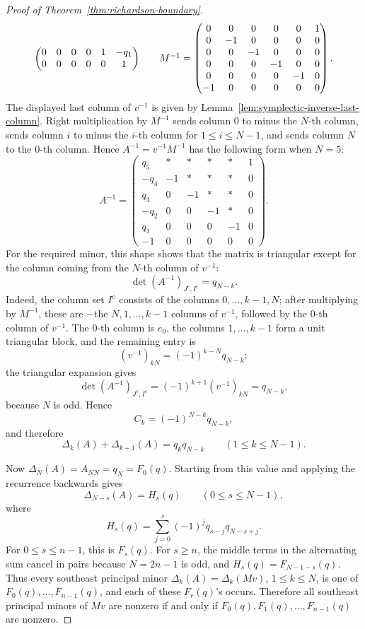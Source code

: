 \documentclass{article}
\begin{document}
\begin{proof}[Proof of Theorem~\ref{thm:richardson-boundary}]
\[\begin{array}{c@{\qquad}c}
\begin{pmatrix}
0&0&0&0&1&-q_1\\
0&0&0&0&0&1
\end{pmatrix}
&
M^{-1}=
\begin{pmatrix}
0&0&0&0&0&1\\
0&-1&0&0&0&0\\
0&0&-1&0&0&0\\
0&0&0&-1&0&0\\
0&0&0&0&-1&0\\
-1&0&0&0&0&0
\end{pmatrix}.
\end{array}
\]
The displayed last column of \(v^{-1}\) is given by Lemma~\ref{lem:symplectic-inverse-last-column}.
Right multiplication by \(M^{-1}\) sends column \(0\) to minus the \(N\)-th column, sends column \(i\) to minus the \(i\)-th column for \(1\le i\le N-1\), and sends column \(N\) to the \(0\)-th column. Hence \(A^{-1}=v^{-1}M^{-1}\) has the following form when \(N=5\):
\[
A^{-1}=
\begin{pmatrix}
q_5&*&*&*&*&1\\
-q_4&-1&*&*&*&0\\
q_3&0&-1&*&*&0\\
-q_2&0&0&-1&*&0\\
q_1&0&0&0&-1&0\\
-1&0&0&0&0&0
\end{pmatrix}.
\]
For the required minor, this shape shows that the matrix is triangular except for the column coming from the \(N\)-th column of \(v^{-1}\):
\[
\det(A^{-1})_{J^c,I^c}=q_{N-k}.
\]
Indeed, the column set \(I^c\) consists of the columns \(0,\ldots,k-1,N\); after multiplying by \(M^{-1}\), these are \(-\)the \(N,1,\ldots,k-1\) columns of \(v^{-1}\), followed by the \(0\)-th column of \(v^{-1}\). The \(0\)-th column is \(e_0\), the columns \(1,\ldots,k-1\) form a unit triangular block, and the remaining entry is
\[
(v^{-1})_{kN}=(-1)^{k-N}q_{N-k};
\]
the triangular expansion gives
\[
\det(A^{-1})_{J^c,I^c}
=(-1)^{k+1}(v^{-1})_{kN}
=q_{N-k},
\]
because \(N\) is odd. Hence
\[
C_k=(-1)^{N-k}q_{N-k},
\]
and therefore
\[
\Delta_k(A)+\Delta_{k+1}(A)=q_kq_{N-k}
\qquad(1\le k\le N-1).
\]

Now \(\Delta_N(A)=A_{NN}=q_N=F_0(q)\). Starting from this value and applying the recurrence backwards gives
\[
\Delta_{N-s}(A)=H_s(q)
\qquad(0\le s\le N-1),
\]
where
\[
H_s(q)=\sum_{j=0}^s(-1)^jq_{s-j}q_{N-s+j}.
\]
For \(0\le s\le n-1\), this is \(F_s(q)\). For \(s\ge n\), the middle terms in the alternating sum cancel in pairs because \(N=2n-1\) is odd, and \(H_s(q)=F_{N-1-s}(q)\). Thus every southeast principal minor \(\Delta_k(A)=\Delta_k(Mv)\), \(1\le k\le N\), is one of \(F_0(q),\ldots,F_{n-1}(q)\), and each of these \(F_r(q)\)'s occurs. Therefore all southeast principal minors of \(Mv\) are nonzero if and only if \(F_0(q),F_1(q),\ldots,F_{n-1}(q)\) are nonzero.


\end{proof}
\end{document}
